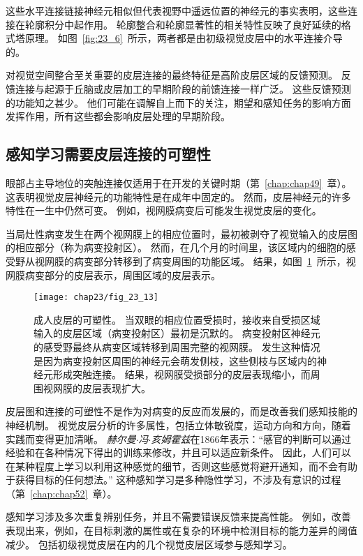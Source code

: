 这些水平连接链接神经元相似但代表视野中遥远位置的神经元的事实表明，这些连接在轮廓积分中起作用。
轮廓整合和轮廓显著性的相关特性反映了良好延续的格式塔原理。
如图~\ref{fig:23_6}~所示，两者都是由初级视觉皮层中的水平连接介导的。


对视觉空间整合至关重要的皮层连接的最终特征是高阶皮层区域的反馈预测。
反馈连接与起源于丘脑或皮层加工的早期阶段的前馈连接一样广泛。
这些反馈预测的功能知之甚少。
他们可能在调解自上而下的关注，期望和感知任务的影响方面发挥作用，所有这些都会影响皮层处理的早期阶段。



\subsection{感知学习需要皮层连接的可塑性}

眼部占主导地位的突触连接仅适用于在开发的关键时期（第~\ref{chap:chap49}~章）。
这表明视觉皮层神经元的功能特性是在成年中固定的。
然而，皮层神经元的许多特性在一生中仍然可变。
例如，视网膜病变后可能发生视觉皮层的变化。


当局灶性病变发生在两个视网膜上的相应位置时，最初被剥夺了视觉输入的皮层图的相应部分（称为病变投射区）。
然而，在几个月的时间里，该区域内的细胞的感受野从视网膜的病变部分转移到了病变周围的功能区域。
结果，如图~\ref{fig:23_13}~所示，视网膜病变部分的皮层表示，周围区域的皮层表示。


\begin{figure}[htbp]
	\centering
	\texttt{[image: chap23/fig\_23\_13]}
	\caption{成人皮层的可塑性。
		当双眼的相应位置受损时，接收来自受损区域输入的皮层区域（病变投射区）最初是沉默的。
		病变投射区神经元的感受野最终从病变区域转移到周围完整的视网膜。
		发生这种情况是因为病变投射区周围的神经元会萌发侧枝，这些侧枝与区域内的神经元形成突触连接。
		结果，视网膜受损部分的皮层表现缩小，而周围视网膜的皮层表现扩大。}
	\label{fig:23_13}
\end{figure}


皮层图和连接的可塑性不是作为对病变的反应而发展的，而是改善我们感知技能的神经机制。
视觉皮层分析的许多属性，包括立体敏锐度，运动方向和方向，随着实践而变得更加清晰。
\textit{赫尔曼$\cdot$冯$\cdot$亥姆霍兹}在1866年表示：“感官的判断可以通过经验和在各种情况下得出的训练来修改，并且可以适应新条件。
因此，人们可以在某种程度上学习以利用这种感觉的细节，否则这些感觉将避开通知，而不会有助于获得目标的任何想法。” 
这种感知学习是多种隐性学习，不涉及有意识的过程（第~\ref{chap:chap52}~章）。


感知学习涉及多次重复辨别任务，并且不需要错误反馈来提高性能。
例如，改善表现出来，例如，在目标刺激的属性或在复杂的环境中检测目标的能力差异的阈值减少。
包括初级视觉皮层在内的几个视觉皮层区域参与感知学习。


